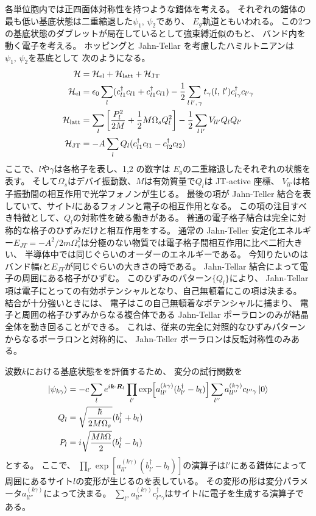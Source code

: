 \documentclass[11pt,dvipdfmx,a4paper]{jsarticle}
\begin{document}
各単位胞内では正四面体対称性を持つような錯体を考える。
それぞれの錯体の最も低い基底状態は二重縮退した\(\psi_1,\,\psi_2\)であり、
\(E_g\)軌道ともいわれる。
この2つの基底状態のダブレットが局在しているとして強束縛近似のもと、
バンド内を動く電子を考える。
ホッピングと Jahn-Tellar を考慮したハミルトニアンは\(\psi_1,\,\psi_2\)を基底として
次のようになる。
\begin{align}
    \mathcal{H} &= \mathcal{H}_\text{el} + \mathcal{H}_\text{latt} + \mathcal{H}_\text{JT}\\
    \mathcal{H}_\text{el} &= \epsilon_0 \sum_l (c_{l1}^{\dagger}c_{l1}+c_{l1}^{\dagger}c_{l1})-\frac{1}{2}\sum_{l\,l',\,\gamma}t_\gamma(l,\,l')c_{l\gamma}^{\dagger}c_{l'\gamma}\\
    \mathcal{H}_\text{latt} &= \sum_l \qty[\frac{P_l^2}{2M}+\frac{1}{2}M\Omega_s Q_l^2]-\frac{1}{2}\sum_{l\,l'} V_{ll'}Q_lQ_{l'}\\
    \mathcal{H}_\text{JT} &= -A\sum_l Q_l(c_{l1}^{\dagger}c_{l1}-c_{l2}^{\dagger}c_{l2})
\end{align}
ここで、\(l\)や\(\gamma\)は各格子を表し、1,2 の数字は \(E_g\)の二重縮退したそれぞれの状態を表す。
そして\(\Omega_s\)はデバイ振動数、\(M\)は有効質量で\(Q_l\)は JT-active 座標、
 \(V_{ll'}\)は格子振動間の相互作用で光学フォノンが生じる。
最後の項が Jahn-Teller 結合を表していて、サイト\(l\)にあるフォノンと電子の相互作用となる。
この項の注目すべき特徴として、\(Q_l\)の対称性を破る働きがある。
普通の電子格子結合は完全に対称的な格子のひずみだけと相互作用をする。
通常の Jahn-Teller 安定化エネルギー\(E_{JT}=-A^2/2m\Omega_s^2\)は分極のない物質では電子格子間相互作用に比べ二桁大きい、
半導体中では同じぐらいのオーダーのエネルギーである。
今知りたいのはバンド幅\(t\)と\(E_{JT}\)が同じぐらいの大きさの時である。
Jahn-Tellar 結合によって電子の周囲にある格子がひずむ。
このひずみのパターン\(\{Q_l\}\)により、
Jahn-Tellar 項は電子にとっての有効ポテンシャルとなり、自己無頓着にこの項は決まる。
結合が十分強いときには、
電子はこの自己無頓着なポテンシャルに捕まり、
電子と周囲の格子ひずみからなる複合体である Jahn-Tellar ポーラロンのみが結晶全体を動き回ることができる。
これは、従来の完全に対照的なひずみパターンからなるポーラロンと対称的に、
Jahn-Teller ポーラロンは反転対称性のみある。

波数\(k\)における基底状態をを評価するため、
変分の試行関数を
\begin{equation}
    \begin{split}
        \ket{\psi_{k\gamma}}
            &=- c\sum_l e^{i\vb*{k}\cdot\vb*{R}_l}
            \prod_{l'}\exp[a_{ll'}^{(k\gamma)}(b_{l'}^{\dagger}-b_{l})]
            \sum_{l''} a_{ll''}^{(k\gamma)}c_{l''\gamma}\ket{0}\\
        Q_l &= \sqrt{\frac{\hbar}{2M\Omega_s}}(b_l^{\dagger}+b_l)\\
        P_l &= i\sqrt{\frac{M\hbar\Omega}{2}}(b_l^{\dagger}-b_l)
    \end{split}
\end{equation}
とする。
ここで、
\(\prod_{l'}\exp[a_{ll'}^{(k\gamma)}(b_{l'}^\dagger-b_l)]\)の演算子は\(l'\)にある錯体によって
周囲にあるサイト\(l\)の変形が生じるのを表している。
その変形の形は変分パラメータ\(a_{ll''}^{(k\gamma)}\)によって決まる。
\(\sum_{l''}a_{ll''}^{(k\gamma)}c_{l''\gamma}^{\dagger}\)はサイト\(l\)に電子を生成する演算子である。
\end{document}
